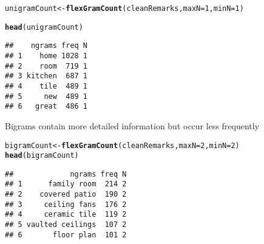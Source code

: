 \documentclass{article}\usepackage[]{graphicx}\usepackage[]{color}
\makeatletter
\newcommand{\hlnum}[1]{\textcolor[rgb]{0.686,0.059,0.569}{#1}}%
\newcommand{\hlstd}[1]{\textcolor[rgb]{0.345,0.345,0.345}{#1}}%
\newcommand{\hlkwb}[1]{\textcolor[rgb]{0.69,0.353,0.396}{#1}}%
\newcommand{\hlkwc}[1]{\textcolor[rgb]{0.333,0.667,0.333}{#1}}%
\newcommand{\hlkwd}[1]{\textcolor[rgb]{0.737,0.353,0.396}{\textbf{#1}}}%
\newenvironment{kframe}{%
 \def\at@end@of@kframe{}%
 \ifinner\ifhmode%
  \def\at@end@of@kframe{\end{minipage}}%
  \begin{minipage}{\columnwidth}%
 \fi\fi%
 \def\FrameCommand##1{\hskip\@totalleftmargin \hskip-\fboxsep
 \colorbox{shadecolor}{##1}\hskip-\fboxsep
     \hskip-\linewidth \hskip-\@totalleftmargin \hskip\columnwidth}%
 \MakeFramed {\advance\hsize-\width
   \@totalleftmargin\z@ \linewidth\hsize
   \@setminipage}}%
 {\par\unskip\endMakeFramed%
 \at@end@of@kframe}
\newenvironment{knitrout}{}{} %
\makeatother
\begin{document}
\begin{knitrout}\footnotesize
{}\color{fgcolor}\begin{kframe}
\begin{alltt}
\hlstd{unigramCount} \hlkwb{<-} \hlkwd{flexGramCount}\hlstd{(cleanRemarks ,} \hlkwc{maxN}\hlstd{=}\hlnum{1} \hlstd{,} \hlkwc{minN}\hlstd{=}\hlnum{1}\hlstd{)}
\end{alltt}


{\ttfamily\noindent\itshape\color{messagecolor}{\#\# Loading required package: ngram}}

{\ttfamily\noindent\itshape\color{messagecolor}{\#\# Loading required package: doParallel}}

{\ttfamily\noindent\itshape\color{messagecolor}{\#\# Loading required package: foreach}}

{\ttfamily\noindent\itshape\color{messagecolor}{\#\# Loading required package: iterators}}

{\ttfamily\noindent\itshape\color{messagecolor}{\#\# Loading required package: parallel}}

{\ttfamily\noindent\itshape\color{messagecolor}{\#\# Loading required package: stringi}}\begin{alltt}
\hlkwd{head}\hlstd{(unigramCount)}
\end{alltt}
\begin{verbatim}
##    ngrams freq N
## 1    home 1028 1
## 2    room  719 1
## 3 kitchen  687 1
## 4    tile  489 1
## 5     new  489 1
## 6   great  486 1
\end{verbatim}
\end{kframe}
\end{knitrout}

\noindent Bigrams contain more detailed information but occur less frequently
\begin{knitrout}\footnotesize
{}\color{fgcolor}\begin{kframe}
\begin{alltt}
\hlstd{bigramCount} \hlkwb{<-} \hlkwd{flexGramCount}\hlstd{(cleanRemarks ,} \hlkwc{maxN}\hlstd{=}\hlnum{2} \hlstd{,} \hlkwc{minN}\hlstd{=}\hlnum{2}\hlstd{)}
\hlkwd{head}\hlstd{(bigramCount)}
\end{alltt}
\begin{verbatim}
##             ngrams freq N
## 1      family room  214 2
## 2    covered patio  190 2
## 3     ceiling fans  176 2
## 4     ceramic tile  119 2
## 5 vaulted ceilings  107 2
## 6       floor plan  101 2
\end{verbatim}
\end{kframe}
\end{knitrout}
\end{document}

